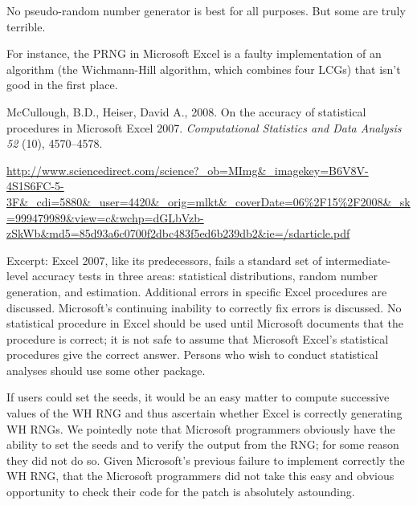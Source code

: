 \documentclass[landscape]{slides}
\begin{document}
\begin{slide}
    
    No pseudo-random number generator is best for all purposes.
    But some are truly terrible.
    
    For instance, the PRNG in Microsoft Excel is a faulty implementation of an 
    algorithm (the Wichmann-Hill algorithm, which combines four LCGs)
    that isn't good in the first place.

\end{slide}

\begin{slide}    
McCullough, B.D., Heiser, David A., 2008. On the accuracy of statistical procedures in Microsoft Excel 2007. {\em Computational Statistics and Data Analysis 52\/} (10), 4570--4578.

\url{http://www.sciencedirect.com/science?_ob=MImg&_imagekey=B6V8V-4S1S6FC-5-3F&_cdi=5880&_user=4420&_orig=mlkt&_coverDate=06\%2F15\%2F2008&_sk=999479989&view=c&wchp=dGLbVzb-zSkWb&md5=85d93a6c0700f2dbc483f5ed6b239db2&ie=/sdarticle.pdf}

Excerpt: Excel 2007, like its predecessors, fails a standard set of intermediate-level accuracy tests in three areas: statistical distributions, random number generation, and estimation. Additional errors in specific Excel procedures are discussed. Microsoft's continuing inability to correctly fix errors is discussed. No statistical procedure in Excel should be used until Microsoft documents that the procedure is correct; it is not safe to assume that Microsoft Excel's statistical procedures give the correct answer. Persons who wish to conduct statistical analyses should use some other package.

If users could set the seeds, it would be an easy matter to compute successive values of the WH RNG and thus ascertain whether Excel is correctly generating WH RNGs. We pointedly note that Microsoft programmers obviously have the ability to set the seeds and to verify the output from the RNG; for some reason they did not do so. Given Microsoft's previous failure to implement correctly the WH RNG, that the Microsoft programmers did not take this easy and obvious opportunity to check their code for the patch is absolutely astounding.

\end{slide}
\end{document}

